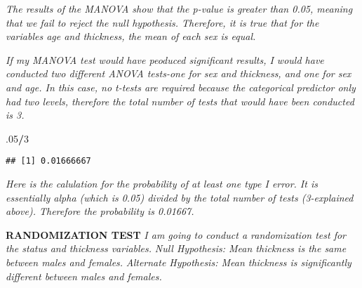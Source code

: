 \documentclass[]{article}
\newenvironment{Shaded}{\begin{snugshade}}{\end{snugshade}}
\newcommand{\ControlFlowTok}[1]{\textcolor[rgb]{0.13,0.29,0.53}{\textbf{#1}}}
\newcommand{\DataTypeTok}[1]{\textcolor[rgb]{0.13,0.29,0.53}{#1}}
\newcommand{\DecValTok}[1]{\textcolor[rgb]{0.00,0.00,0.81}{#1}}
\newcommand{\FloatTok}[1]{\textcolor[rgb]{0.00,0.00,0.81}{#1}}
\newcommand{\KeywordTok}[1]{\textcolor[rgb]{0.13,0.29,0.53}{\textbf{#1}}}
\newcommand{\NormalTok}[1]{#1}
\newcommand{\OperatorTok}[1]{\textcolor[rgb]{0.81,0.36,0.00}{\textbf{#1}}}
\newcommand{\StringTok}[1]{\textcolor[rgb]{0.31,0.60,0.02}{#1}}
\begin{document}
\emph{The results of the MANOVA show that the p-value is greater than
0.05, meaning that we fail to reject the null hypothesis. Therefore, it
is true that for the variables age and thickness, the mean of each sex
is equal.}

\emph{If my MANOVA test would have peoduced significant results, I would
have conducted two different ANOVA tests-one for sex and thickness, and
one for sex and age. In this case, no t-tests are required because the
categorical predictor only had two levels, therefore the total number of
tests that would have been conducted is 3. }

\begin{Shaded}
\begin{Highlighting}[]
\FloatTok{.05}\OperatorTok{/}\DecValTok{3}
\end{Highlighting}
\end{Shaded}

\begin{verbatim}
## [1] 0.01666667
\end{verbatim}

\emph{Here is the calulation for the probability of at least one type I
error. It is essentially alpha (which is 0.05) divided by the total
number of tests (3-explained above). Therefore the probability is
0.01667.}

\textbf{RANDOMIZATION TEST} \emph{I am going to conduct a randomization
test for the status and thickness variables.} \emph{Null Hypothesis:
Mean thickness is the same between males and females.} \emph{Alternate
Hypothesis: Mean thickness is significantly different between males and
females.}

\begin{Shaded}
\end{Shaded}
\end{document}
